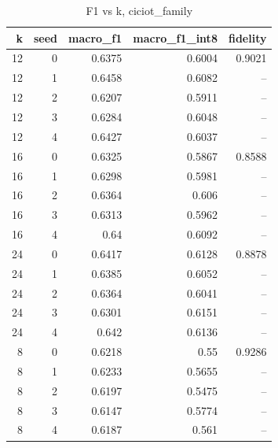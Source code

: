 \begin{table}
\caption{F1 vs k, ciciot_family}
\begin{tabular}{rrrrr}
\toprule
k & seed & macro_f1 & macro_f1_int8 & fidelity \\
\midrule
12 & 0 & 0.6375 & 0.6004 & 0.9021 \\
12 & 1 & 0.6458 & 0.6082 & -- \\
12 & 2 & 0.6207 & 0.5911 & -- \\
12 & 3 & 0.6284 & 0.6048 & -- \\
12 & 4 & 0.6427 & 0.6037 & -- \\
16 & 0 & 0.6325 & 0.5867 & 0.8588 \\
16 & 1 & 0.6298 & 0.5981 & -- \\
16 & 2 & 0.6364 & 0.606 & -- \\
16 & 3 & 0.6313 & 0.5962 & -- \\
16 & 4 & 0.64 & 0.6092 & -- \\
24 & 0 & 0.6417 & 0.6128 & 0.8878 \\
24 & 1 & 0.6385 & 0.6052 & -- \\
24 & 2 & 0.6364 & 0.6041 & -- \\
24 & 3 & 0.6301 & 0.6151 & -- \\
24 & 4 & 0.642 & 0.6136 & -- \\
8 & 0 & 0.6218 & 0.55 & 0.9286 \\
8 & 1 & 0.6233 & 0.5655 & -- \\
8 & 2 & 0.6197 & 0.5475 & -- \\
8 & 3 & 0.6147 & 0.5774 & -- \\
8 & 4 & 0.6187 & 0.561 & -- \\
\bottomrule
\end{tabular}
\end{table}
